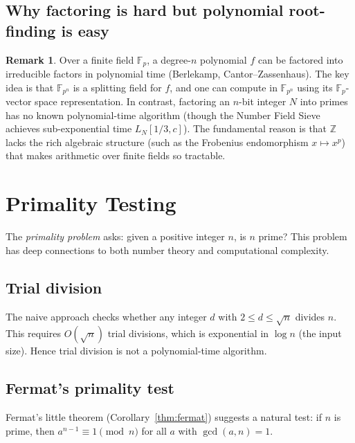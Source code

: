 \documentclass[twoside,12pt]{book}
\theoremstyle{plain}
\theoremstyle{definition}
\newtheorem{remark}[theorem]{Remark}
\theoremstyle{remark}
\begin{document}
\subsection{Why factoring is hard but polynomial root-finding is easy}

\begin{remark}
Over a finite field $\mathbb{F}_p$, a degree-$n$ polynomial $f$ can be factored into irreducible factors in polynomial time (Berlekamp, Cantor--Zassenhaus). The key idea is that $\mathbb{F}_{p^n}$ is a splitting field for $f$, and one can compute in $\mathbb{F}_{p^n}$ using its $\mathbb{F}_p$-vector space representation. In contrast, factoring an $n$-bit integer $N$ into primes has no known polynomial-time algorithm (though the Number Field Sieve achieves sub-exponential time $L_N[1/3, c]$). The fundamental reason is that $\mathbb{Z}$ lacks the rich algebraic structure (such as the Frobenius endomorphism $x \mapsto x^p$) that makes arithmetic over finite fields so tractable.
\end{remark}

\section{Primality Testing}
\label{sec:primality}

The \emph{primality problem} asks: given a positive integer $n$, is $n$ prime? This problem has deep connections to both number theory and computational complexity.

\subsection{Trial division}

The naive approach checks whether any integer $d$ with $2 \leq d \leq \sqrt{n}$ divides $n$. This requires $O(\sqrt{n})$ trial divisions, which is exponential in $\log n$ (the input size). Hence trial division is not a polynomial-time algorithm.

\subsection{Fermat's primality test}

Fermat's little theorem (Corollary~\ref{thm:fermat}) suggests a natural test: if $n$ is prime, then $a^{n-1} \equiv 1 \pmod{n}$ for all $a$ with $\gcd(a, n) = 1$.
\end{document}
